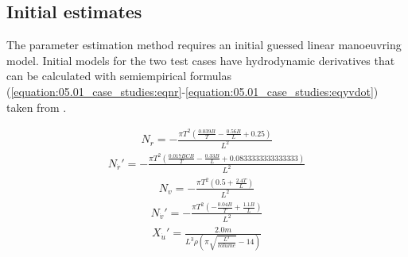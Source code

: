 \begin{appendices}
\renewcommand{\theequation}{\thechapter.\arabic{equation}}

\chapter{Initial estimates}
\label{app:initial_estimates}
The parameter estimation method requires an initial guessed linear manoeuvring model. Initial models for the two test cases have hydrodynamic derivatives that can be calculated with semi\-empirical formulas (\autoref{equation:05.01_case_studies:eqnr}-\autoref{equation:05.01_case_studies:eqyvdot}) taken from \cite{brixManoeuvringTechnicalManual1993}.

\begin{equation}\label{equation:05.01_case_studies:eqnr}
\begin{split}\displaystyle N_{r} = - \frac{\pi T^{2} \left(\frac{0.039 B}{T} - \frac{0.56 B}{L} + 0.25\right)}{L^{2}}\end{split}
\end{equation}\begin{equation}\label{equation:05.01_case_studies:eqnrdot}
\begin{split}\displaystyle N_{\dot{r}}' = - \frac{\pi T^{2} \left(\frac{0.017 B CB}{T} - \frac{0.33 B}{L} + 0.0833333333333333\right)}{L^{2}}\end{split}
\end{equation}\begin{equation}\label{equation:05.01_case_studies:eqnv}
\begin{split}\displaystyle N_{v} = - \frac{\pi T^{2} \left(0.5 + \frac{2.4 T}{L}\right)}{L^{2}}\end{split}
\end{equation}\begin{equation}\label{equation:05.01_case_studies:eqnvdot}
\begin{split}\displaystyle N_{\dot{v}}' = - \frac{\pi T^{2} \left(- \frac{0.04 B}{T} + \frac{1.1 B}{L}\right)}{L^{2}}\end{split}
\end{equation}\begin{equation}\label{equation:05.01_case_studies:eqxudot}
\begin{split}\displaystyle X_{\dot{u}}' = \frac{2.0 m}{L^{3} \rho \left(\pi \sqrt{\frac{L^{3}}{volume}} - 14\right)}\end{split}
\end{equation}\begin{equation}\label{equation:05.01_case_studies:eqyr}

\end{equation}
\end{appendices}
